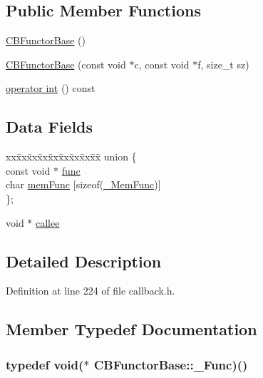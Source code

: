 \subsection*{Public Member Functions}
\begin{DoxyCompactItemize}
\item 
\hyperlink{class_c_b_functor_base_ac58bcfd005e23b2fa7e688f1eb95b3e0}{C\+B\+Functor\+Base} ()
\item 
\hyperlink{class_c_b_functor_base_a304a1983beadf69db44637eefcc56fee}{C\+B\+Functor\+Base} (const void $\ast$c, const void $\ast$f, size\+\_\+t sz)
\item 
\hyperlink{class_c_b_functor_base_a3e132358f2cb0533ab0fe0b833ee0f2d}{operator int} () const 
\end{DoxyCompactItemize}
\subsection*{Data Fields}
\begin{DoxyCompactItemize}
\item 
\begin{tabbing}
xx\=xx\=xx\=xx\=xx\=xx\=xx\=xx\=xx\=\kill
union \{\\
\>const void $\ast$ \hyperlink{class_c_b_functor_base_a113ee15c661b06d1757b767f85fd6b81}{func}\\
\>char \hyperlink{class_c_b_functor_base_af64bc23d3a1821de1a1ab2365f98b13c}{memFunc} \mbox{[}sizeof(\hyperlink{class_c_b_functor_base_a1fae4d86f8096277b2824602d168ef5a}{\_MemFunc})\mbox{]}\\
\}; \\

\end{tabbing}\item 
void $\ast$ \hyperlink{class_c_b_functor_base_a4350b45a3bc31a07ef188c61ee7af584}{callee}
\end{DoxyCompactItemize}


\subsection{Detailed Description}


Definition at line 224 of file callback.\+h.



\subsection{Member Typedef Documentation}
\hypertarget{class_c_b_functor_base_a36d82f62e1ba03af6b0b24da52d8a96d}{
\subsubsection[{\+\_\+\+Func}]{\setlength{\rightskip}{0pt plus 5cm}typedef void($\ast$ C\+B\+Functor\+Base\+::\+\_\+\+Func)()}}\label{class_c_b_functor_base_a36d82f62e1ba03af6b0b24da52d8a96d}


